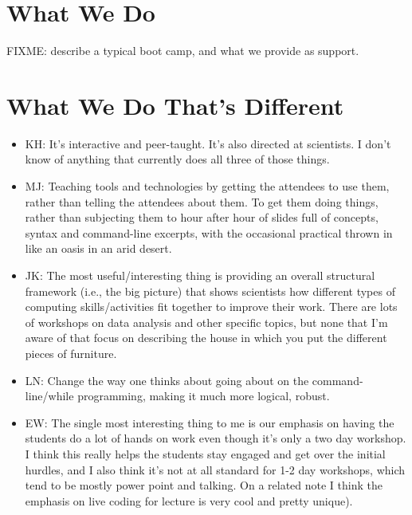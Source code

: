 \documentclass{article}
\begin{document}
\section{What We Do}

FIXME: describe a typical boot camp, and what we provide as support.

\section{What We Do That's Different}

\begin{itemize}

  \item KH: It's interactive and peer-taught. It's also directed at
    scientists. I don't know of anything that currently does all three
    of those things.

  \item MJ: Teaching tools and technologies by getting the attendees
    to use them, rather than telling the attendees about them. To get
    them doing things, rather than subjecting them to hour after hour
    of slides full of concepts, syntax and command-line excerpts, with
    the occasional practical thrown in like an oasis in an arid
    desert.

  \item JK: The most useful/interesting thing is providing an overall
    structural framework (i.e., the big picture) that shows scientists
    how different types of computing skills/activities fit together to
    improve their work. There are lots of workshops on data analysis
    and other specific topics, but none that I'm aware of that focus
    on describing the house in which you put the different pieces of
    furniture.

  \item LN: Change the way one thinks about going about on the
    command-line/while programming, making it much more logical,
    robust.

  \item EW: The single most interesting thing to me is our emphasis on
    having the students do a lot of hands on work even though it's
    only a two day workshop. I think this really helps the students
    stay engaged and get over the initial hurdles, and I also think
    it's not at all standard for 1-2 day workshops, which tend to be
    mostly power point and talking. On a related note I think the
    emphasis on live coding for lecture is very cool and pretty
    unique).


\end{itemize}
\end{document}
